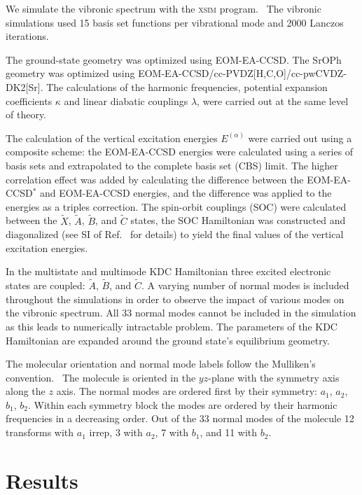 \documentclass{article}
\begin{document}
We simulate the vibronic spectrum with the \textsc{xsim}
program.~\autocite{Sharma:xsim_socjt:2024} The vibronic simulations used 15
basis set functions per vibrational mode and 2000 Lanczos iterations.
 
The ground-state geometry was optimized using EOM-EA-CCSD. The SrOPh geometry
was optimized using EOM-EA-CCSD/cc-PVDZ[H,C,O]/cc-pwCVDZ-DK2[Sr]. The
calculations of the harmonic frequencies, potential expansion coefficients
$\kappa$ and linear diabatic couplings $\lambda$, were carried out at the same
level of theory.

The calculation of the vertical excitation energies $E ^{(\alpha)}$ were
carried out using a composite scheme: the EOM-EA-CCSD energies were calculated
using a series of basis sets and extrapolated to the complete basis set (CBS)
limit. The higher correlation effect was added by calculating the difference
between the EOM-EA-CCSD$^*$ and EOM-EA-CCSD energies, and the difference was
applied to the energies as a triples correction. The spin-orbit couplings (SOC)
were calculated between the $\tilde{X}$, $\tilde{A}$, $\tilde{B}$, and
$\tilde{C}$ states, the SOC Hamiltonian was constructed and diagonalized (see
SI of Ref.~\cite{Khvorost:dualOCC:2024} for details) to yield the final
values of the vertical excitation energies.

In the multistate and multimode KDC Hamiltonian three excited electronic states are coupled: $\tilde{A}$, $\tilde{B}$, and $\tilde{C}$. A varying number of normal modes is included throughout the simulations in order to observe the impact of various modes on the vibronic spectrum. All 33 normal modes cannot be included in the simulation as this leads to numerically intractable problem. The parameters of the KDC Hamiltonian are expanded around the ground state's equilibrium geometry.

The molecular orientation and normal mode labels follow the Mulliken's
convention.~\autocite{Mulliken:55:symnot} The molecule is oriented in the
$yz$-plane with the symmetry axis along the $z$ axis. The normal modes are
ordered first by their symmetry: $a_1$, $a_2$, $b_1$, $b_2$. Within each
symmetry block the modes are ordered by their harmonic frequencies in a
decreasing order. Out of the 33 normal modes of the molecule 12 transforms with
$a _1$ irrep, 3 with $a_2$, 7 with $b _1$, and 11 with $b _2$.

\section{Results}
\end{document}
